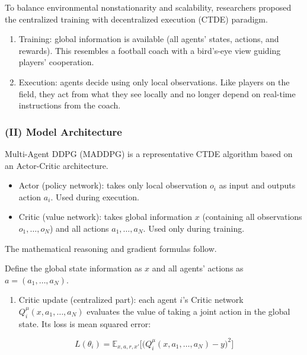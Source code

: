 To balance environmental nonstationarity and scalability, researchers proposed the centralized training with decentralized execution (CTDE) paradigm.

\begin{enumerate}
\def\labelenumi{\arabic{enumi}.}
\item
  Training: global information is available (all agents' states, actions, and rewards). This resembles a football coach with a bird's-eye view guiding players' cooperation.
\item
  Execution: agents decide using only local observations. Like players on the field, they act from what they see locally and no longer depend on real-time instructions from the coach.
\end{enumerate}

\hypertarget{ii-model-architecture}{%
\subsubsection{(II) Model Architecture}\label{ii-model-architecture}}

Multi-Agent DDPG (MADDPG) is a representative CTDE algorithm based on an Actor-Critic architecture.

\begin{itemize}
\tightlist
\item
  Actor (policy network): takes only local observation \(o_i\) as input and outputs action \(a_i\). Used during execution.
\item
  Critic (value network): takes global information \(x\) (containing all observations \(o_1,\ldots,o_N\)) and all actions \(a_1,\ldots,a_N\). Used only during training.
\end{itemize}

The mathematical reasoning and gradient formulas follow.

Define the global state information as \(x\) and all agents' actions as \(a=(a_1,\ldots,a_N)\).

\begin{enumerate}
\def\labelenumi{\arabic{enumi}.}
\tightlist
\item
{}
  Critic update (centralized part): each agent \(i\)'s Critic network \(Q_i^{\mu}(x,a_1,\ldots,a_N)\) evaluates the value of taking a joint action in the global state. Its loss is mean squared error:
\end{enumerate}

\[
L(\theta_i)
=
\mathbb{E}_{x,a,r,x'}
\bigl[
\bigl(
Q_i^{\mu}(x,a_1,\ldots,a_N)-y
\bigr)^{2}
\bigr]
\]

